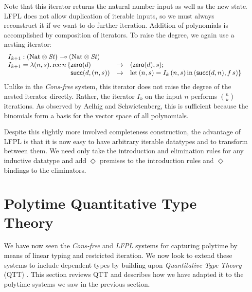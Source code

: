 \documentclass[acmsmall,screen]{acmart}
\newcommand{\tmRec}{\mathrm{rec}}
\newcommand{\tyNat}{\mathrm{Nat}}
\newcommand{\conZero}{\mathsf{zero}}
\newcommand{\conSucc}{\mathsf{succ}}
\newcommand{\Let}{\mathrm{let}}
\newcommand{\In}{\mathrm{in}}
\begin{document}
Note that this iterator returns the natural number input as well as
the new state. LFPL does not allow duplication of iterable inputs, so
we must always reconstruct it if we want to do further
iteration. Addition of polynomials is accomplished by composition of
iterators. To raise the degree, we again use a nesting iterator:
\begin{displaymath}
  \begin{array}{l}
    I_{k+1} : (\tyNat \otimes \mathit{St}) \multimap (\tyNat \otimes \mathit{St}) \\
    I_{k+1} = \lambda (n,s).\,\tmRec\,n\,\{
    \begin{array}[t]{@{}lcl}
      \conZero(d)&\mapsto&(\conZero(d),s); \\
      \conSucc(d,(n,s)) &\mapsto& \Let\,(n,s)=I_k\,(n,s)\,\In\,(\conSucc(d,n), f\,s) \}
    \end{array}
  \end{array}
\end{displaymath}
Unlike in the \emph{Cons-free} system, this iterator does not raise
the degree of the nested iterator directly. Rather, the iterator $I_k$
on the input $n$ performs $\binom{n}{k}$ iterations. As observed by
Aelhig and Schwictenberg, this is sufficient because the binomials
form a basis for the vector space of all polynomials.

Despite this slightly more involved completeness construction, the
advantage of LFPL is that it is now easy to have arbitrary iterable
datatypes and to transform between them. We need only take the
introduction and elimination rules for any inductive datatype and add
$\Diamond$ premises to the introduction rules and $\Diamond$ bindings
to the eliminators.

\section{Polytime Quantitative Type Theory}
\label{sec:qtt}

We have now seen the \emph{Cons-free} and \emph{LFPL} systems for
capturing polytime by means of linear typing and restricted
iteration. We now look to extend these systems to include dependent
types by building upon \emph{Quantitative Type Theory} (QTT)
\cite{atkey18qtt,mcbride16}. This section reviews QTT and describes
how we have adapted it to the polytime systems we saw in the previous
section.
\end{document}
